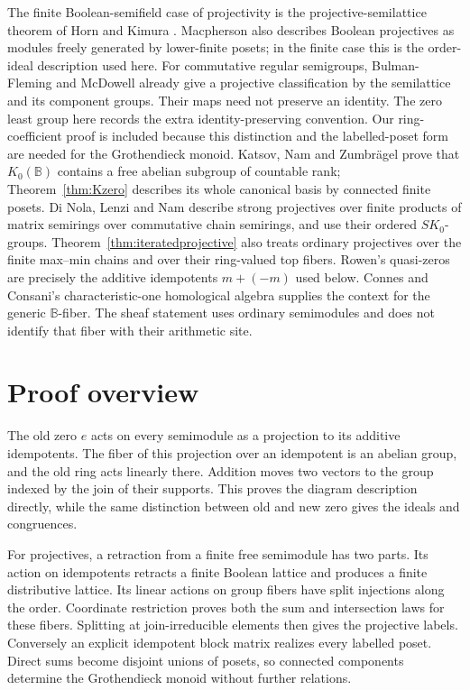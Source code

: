 \documentclass[11pt]{amsart}
\newcommand{\B}{\mathbb B}
\theoremstyle{definition}
\theoremstyle{remark}
\begin{document}
The finite Boolean-semifield case of projectivity is the projective-semilattice theorem of Horn and Kimura \cite[Theorem~5.3]{HK}. Macpherson \cite[Theorem~3.9, pp.~8--9]{Macpherson} also describes Boolean projectives as modules freely generated by lower-finite posets; in the finite case this is the order-ideal description used here. For commutative regular semigroups, Bulman-Fleming and McDowell \cite[Theorem~3.3, pp.~255--258]{BM} already give a projective classification by the semilattice and its component groups. Their maps need not preserve an identity. The zero least group here records the extra identity-preserving convention. Our ring-coefficient proof is included because this distinction and the labelled-poset form are needed for the Grothendieck monoid. Katsov, Nam and Zumbr\"agel \cite[Remark~6.6(3), Proposition~6.7]{KNZ} prove that $K_0(\B)$ contains a free abelian subgroup of countable rank; Theorem~\ref{thm:Kzero} describes its whole canonical basis by connected finite posets. Di Nola, Lenzi and Nam \cite[Abstract]{DLN} describe strong projectives over finite products of matrix semirings over commutative chain semirings, and use their ordered $SK_0$-groups. Theorem~\ref{thm:iteratedprojective} also treats ordinary projectives over the finite max--min chains and over their ring-valued top fibers. Rowen's quasi-zeros \cite{Rowen} are precisely the additive idempotents $m+(-m)$ used below. Connes and Consani's characteristic-one homological algebra \cite{CC} supplies the context for the generic $\B$-fiber. The sheaf statement uses ordinary semimodules and does not identify that fiber with their arithmetic site.

\section{Proof overview}
The old zero $e$ acts on every semimodule as a projection to its additive idempotents. The fiber of this projection over an idempotent is an abelian group, and the old ring acts linearly there. Addition moves two vectors to the group indexed by the join of their supports. This proves the diagram description directly, while the same distinction between old and new zero gives the ideals and congruences.

For projectives, a retraction from a finite free semimodule has two parts. Its action on idempotents retracts a finite Boolean lattice and produces a finite distributive lattice. Its linear actions on group fibers have split injections along the order. Coordinate restriction proves both the sum and intersection laws for these fibers. Splitting at join-irreducible elements then gives the projective labels. Conversely an explicit idempotent block matrix realizes every labelled poset. Direct sums become disjoint unions of posets, so connected components determine the Grothendieck monoid without further relations.
\end{document}

